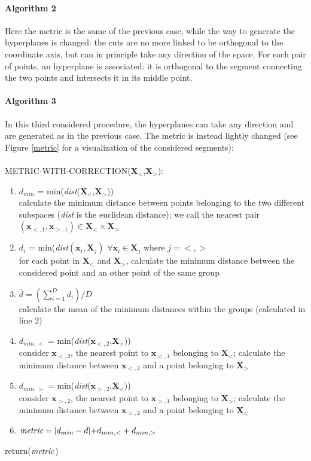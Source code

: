 \documentclass[a4paper]{article}
\begin{document}
\paragraph{Algorithm 2}
Here the metric is the same of the previous case, while the way to generate the hyperplanes is changed:
the cuts are no more linked to be orthogonal to the coordinate axis, but can in principle take any direction of the space.
For each pair of points, an hyperplane is associated: 
it is orthogonal to the segment connecting the two points and intersects it in its middle point.




\paragraph{Algorithm 3}
In this third considered procedure, the hyperplanes can take any direction and are generated as in the previous case.
The metric is instead lightly changed (see Figure \ref{metric} for a visualization of the considered segments):\\ \\
METRIC-WITH-CORRECTION($\pmb{X}_<$,$\pmb{X}_>$):
\begin{enumerate}[nolistsep]
\item $d_{min}$ = min(\emph{dist}($\pmb{X}_<$,$\pmb{X}_>$))\\
calculate the minimum distance between points belonging to the two different subspaces (\emph{dist} is the euclidean distance);
we call the nearest pair $(\pmb{x}_{<,1},\pmb{x}_{>,1}) \in \pmb{X}_< \times \pmb{X}_>$ 
\item $d_i$ = min(\emph{dist}$(\pmb{x}_i,\pmb{X}_j)$ $\forall \pmb{x}_i \in \pmb{X}_j$ where $j=<,>$ \\
for each point in $\pmb{X}_<$ and $\pmb{X}_>$, calculate the minimum distance between the considered point and an other point of the same group
\item $\bar{d} = (\sum_{i=1}^D d_i)/D$ \\
 calculate the mean of the minimum distances within the groups (calculated in line 2)
\item $d_{min,<}$ = min(\emph{dist}($\pmb{x}_{<,2}$,$\pmb{X}_>$))\\ 
consider $\pmb{x}_{<,2}$, the nearest point to $\pmb{x}_{<,1}$ belonging to $\pmb{X}_<$; 
calculate the minimum distance between $\pmb{x}_{<,2}$ and a point belonging to $ \pmb{X}_>$
\item $d_{min,>}$ = min(\emph{dist}($\pmb{x}_{>,2}$,$\pmb{X}_<$))\\ 
consider $\pmb{x}_{>,2}$, the nearest point to $\pmb{x}_{>,1}$ belonging to $\pmb{X}_>$; 
calculate the minimum distance between $\pmb{x}_{>,2}$ and a point belonging to $ \pmb{X}_<$
\item $\emph{metric} = \lvert d_{min} - \bar{d} \lvert + d_{min,<} + d_{min,>}$
\end{enumerate}
return($\emph{metric}$)\\ \\
\end{document}
